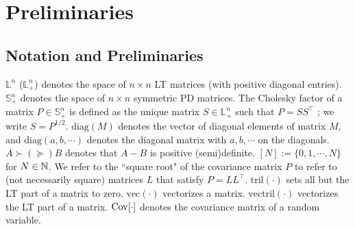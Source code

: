 
\section{Preliminaries}

\subsection{Notation and Preliminaries}
$\mathbb{L}^n$ ($\mathbb{L}_+^n$) denotes the space of $n \times n$ LT matrices (with positive diagonal entries). $\mathbb{S}^n_+$ denotes the space of $n \times n$ symmetric PD  matrices. The Cholesky factor of a matrix \( P \in \mathbb{S}_+^{n} \) is defined as the unique matrix \( S \in \mathbb{L}_+^n \) such that \( P = S S^\top \) \cite[Theorem 4.2.7]{golubMatrixComputations2013}; we write \(S = P^{1/2}\). $\mathrm{diag}(M)$ denotes the vector of diagonal elements of matrix \( M \), and $\mathrm{diag}(a,b, \cdots)$ denotes the diagonal matrix with $a,b, \cdots$ on the diagonals. $A \succ (\succeq) B$ denotes that $A - B $ is positive (semi)definite. \([N] := \{0, 1, \cdots, N\}\) for $N \in \mathbb{N}$.
We refer to the ``square root" of the covariance matrix \(P\) to refer to (not necessarily square) matrices \(L\) that satisfy \(P = L L^\top\). 
$\mathrm{tril}(\cdot)$ sets all but the LT part of a matrix to zero.
$\mathrm{vec}(\cdot)$ vectorizes a matrix.
$\mathrm{vectril}(\cdot)$ vectorizes the LT part of a matrix.
$\mathrm{Cov}[\cdot ]$ denotes the covariance matrix of a random variable.

